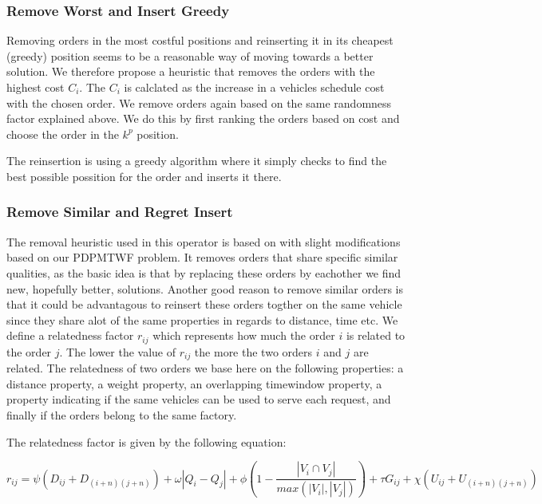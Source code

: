 \documentclass[../main.tex]{subfiles}
\begin{document}
\subsubsection{Remove Worst and Insert Greedy}
Removing orders in the most costful positions and reinserting it in its cheapest (greedy) position seems to be a reasonable way of moving towards a better solution.
We therefore propose a heuristic that removes the orders with the highest cost $C_{i}$.
The $C_i$ is calclated as the increase in a vehicles schedule cost with the chosen order.
We remove orders again based on the same randomness factor explained above. We do this by first ranking the orders based on cost and choose the order in the $k^p$ position. \newline \par
The reinsertion is using a greedy algorithm where it simply checks to find the best possible possition for the order and inserts it there. 
\subsubsection{Remove Similar and Regret Insert}
The removal heuristic used in this operator is based on \citet{shaw97} with slight modifications based on our PDPMTWF problem. 
It removes orders that share specific similar qualities, as the basic idea is that by replacing these orders by eachother we find new, hopefully better, solutions. 
Another good reason to remove similar orders is that it could be advantagous to reinsert these orders togther on the same vehicle since they share alot of the same properties in regards to distance, time etc.
We define a relatedness factor $r_{ij}$ which represents how much the order $i$ is related to the order $j$. 
The lower the value of $r_{ij}$ the more the two orders $i$ and $j$ are related.
The relatedness of two orders we base here on the following properties: 
a distance property, a weight property, an overlapping timewindow property, a property indicating if the same vehicles can be used to serve each request, and finally if the orders belong to the same factory.

The relatedness factor is given by the following equation:

\begin{equation}
\label{relatedness}
    r_{ij} = \psi ( D_{i j} + D_{(i+n)(j+n)}) + \omega|Q_i - Q_j|
    + \phi (1-\dfrac{|V_i\cap V_j|}{max(|V_i|, |V_j|)} ) + \tau G_{ij} + \chi (U_{ij} + U_{(i+n)(j+n)})
\end{equation}
\end{document}
